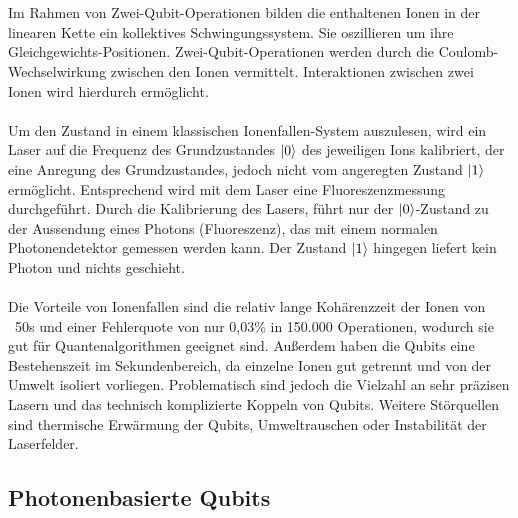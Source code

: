 \\
\\
Im Rahmen von Zwei-Qubit-Operationen bilden die enthaltenen Ionen in der linearen Kette ein kollektives Schwingungssystem. Sie oszillieren um ihre Gleichgewichts-Positionen. Zwei-Qubit-Operationen werden durch die Coulomb-Wechselwirkung zwischen den Ionen vermittelt. Interaktionen zwischen zwei Ionen wird hierdurch ermöglicht. \cite{lapierre_introduction_2021} %
\\
\\
Um den Zustand in einem klassischen Ionenfallen-System auszulesen, wird ein Laser auf die Frequenz des Grundzustandes $\ket0$ des jeweiligen Ions kalibriert, der eine Anregung des Grundzustandes, jedoch nicht vom angeregten Zustand $\ket1$ ermöglicht. Entsprechend wird mit dem Laser eine Fluoreszenzmessung durchgeführt. \cite{lapierre_introduction_2021}
Durch die Kalibrierung des Lasers, führt nur der $\ket0$-Zustand zu der Aussendung eines Photons (Fluoreszenz), das mit einem normalen Photonendetektor gemessen werden kann. Der Zustand $\ket1$ hingegen liefert kein Photon und nichts geschieht. \cite{lapierre_introduction_2021} %
\\
\\
Die Vorteile von Ionenfallen sind die relativ lange Kohärenzzeit der Ionen von ~50s und einer Fehlerquote von nur 0,03\% in 150.000 Operationen, wodurch sie gut für Quantenalgorithmen geeignet sind. \cite{kasirajan_fundamentals_2021}
Außerdem haben die Qubits eine Bestehenszeit im Sekundenbereich, da einzelne Ionen gut getrennt und von der Umwelt isoliert vorliegen. \cite{lapierre_introduction_2021}
Problematisch sind jedoch die Vielzahl an sehr präzisen Lasern und das technisch komplizierte Koppeln von Qubits. Weitere Störquellen sind thermische Erwärmung der Qubits, Umweltrauschen oder Instabilität der Laserfelder. \cite{kasirajan_fundamentals_2021} %


\subsection{Photonenbasierte Qubits}


